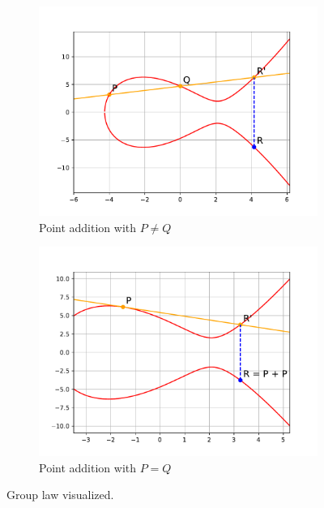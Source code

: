 \documentclass{article}
\begin{document}
\begin{figure}[htbp]
    \begin{subfigure}[t]{.45\textwidth}
        \centering
        \includegraphics[scale = 0.5]{images/point_addition1.pdf}
        \caption{Point addition with $P \ne Q$}
        \label{fig:point_addition}
    \end{subfigure}
    \begin{subfigure}[t]{.45\textwidth}
        \centering
        \includegraphics[scale = 0.5]{images/point_addition2.pdf}
        \caption{Point addition with $P = Q$}
        \label{fig:point_multiplication}
    \end{subfigure}
    \caption{Group law visualized.}
    \label{fig:group_law}
\end{figure}
\end{document}
